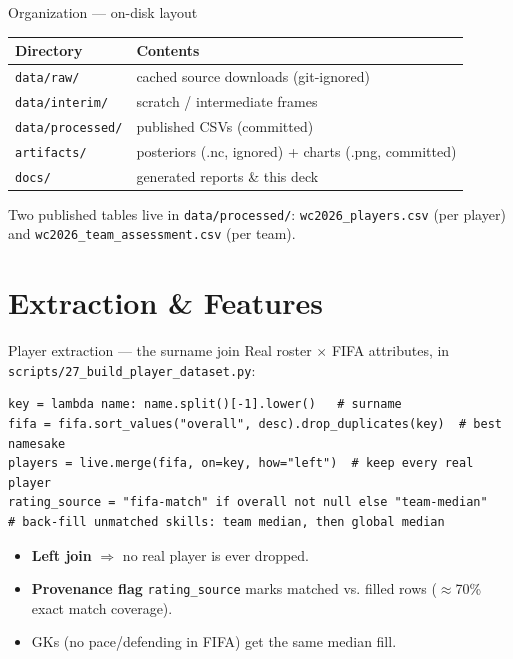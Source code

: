\documentclass[aspectratio=169]{beamer}
\begin{document}
\begin{frame}{Organization --- on-disk layout}
\centering
\begin{tabular}{@{}ll@{}}
\toprule
Directory & Contents \\
\midrule
\texttt{data/raw/}       & cached source downloads (git-ignored) \\
\texttt{data/interim/}   & scratch / intermediate frames \\
\texttt{data/processed/} & published CSVs (committed) \\
\texttt{artifacts/}      & posteriors (.nc, ignored) + charts (.png, committed) \\
\texttt{docs/}           & generated reports \& this deck \\
\bottomrule
\end{tabular}
\vspace{1em}
\footnotesize Two published tables live in \texttt{data/processed/}:
\texttt{wc2026\_players.csv} (per player) and
\texttt{wc2026\_team\_assessment.csv} (per team).
\end{frame}

\section{Extraction \& Features}

\begin{frame}[fragile]{Player extraction --- the surname join}
Real roster $\times$ FIFA attributes, in \texttt{scripts/27\_build\_player\_dataset.py}:
\begin{lstlisting}
key = lambda name: name.split()[-1].lower()   # surname
fifa = fifa.sort_values("overall", desc).drop_duplicates(key)  # best namesake
players = live.merge(fifa, on=key, how="left")  # keep every real player
rating_source = "fifa-match" if overall not null else "team-median"
# back-fill unmatched skills: team median, then global median
\end{lstlisting}
\begin{itemize}\footnotesize
  \item \textbf{Left join} $\Rightarrow$ no real player is ever dropped.
  \item \textbf{Provenance flag} \texttt{rating\_source} marks matched vs.
        filled rows ($\approx$70\% exact match coverage).
  \item GKs (no pace/defending in FIFA) get the same median fill.
\end{itemize}
\end{frame}
\end{document}
